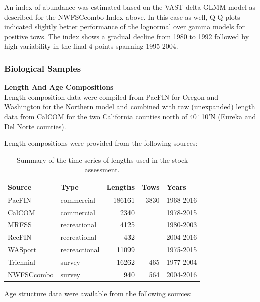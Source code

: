 \documentclass[12pt,]{article}
\begin{document}
An index of abundance was estimated based on the VAST delta-GLMM model
as described for the NWFSCcombo Index above. In this case as well, Q-Q
plots indicated slightly better performance of the lognormal over gamma
models for positive tows. The index shows a gradual decline from 1980 to
1992 followed by high variability in the final 4 points spanning
1995-2004.

\subsubsection{Biological Samples}\label{biological-samples}

\textbf{Length And Age Compositions}\\
Length composition data were compiled from PacFIN for Oregon and
Washington for the Northern model and combined with raw (unexpanded)
length data from CalCOM for the two California counties north of
40\(^\circ\) 10'N (Eureka and Del Norte counties).

Length compositions were provided from the following sources:

\vspace{.5cm}

\begin{table}[ht]
\centering
\caption{Summary of the time series of lengths used in the stock assessment.} 
\label{tab:Length_sources}
\begin{tabular}{llrrl}
  \hline
Source & Type & Lengths & Tows & Years \\ 
  \hline
PacFIN & commercial & 186161 & 3830 & 1968-2016 \\ 
  CalCOM & commercial & 2340 &  & 1978-2015 \\ 
  MRFSS & recreational & 4125 &  & 1980-2003 \\ 
  RecFIN & recreational & 432 &  & 2004-2016 \\ 
  WASport & recreactional & 11099 &  & 1975-2015 \\ 
  Triennial & survey & 16262 & 465 & 1977-2004 \\ 
  NWFSCcombo & survey & 940 & 564 & 2004-2016 \\ 
   \hline
\end{tabular}
\end{table}

Age structure data were available from the following sources:
\vspace{.5cm}
\end{document}
